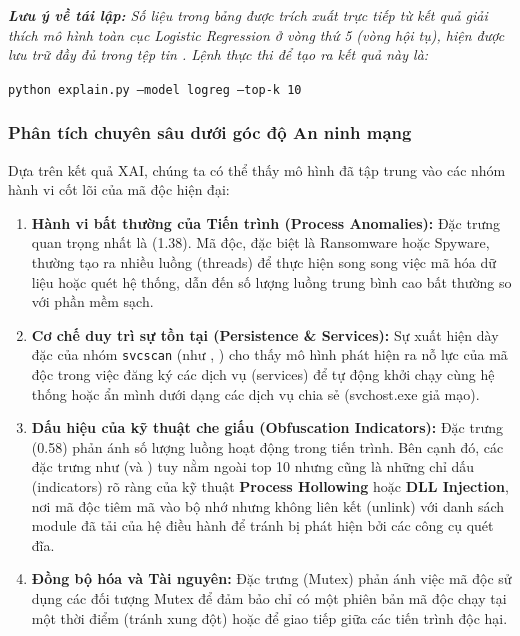 \textit{\textbf{Lưu ý về tái lập:} Số liệu trong bảng được trích xuất trực tiếp từ kết quả giải thích mô hình toàn cục Logistic Regression ở vòng thứ 5 (vòng hội tụ), hiện được lưu trữ đầy đủ trong tệp tin . Lệnh thực thi để tạo ra kết quả này là:}
\begin{center}
\texttt{python explain.py --model logreg --top-k 10}
\end{center}



\subsubsection{Phân tích chuyên sâu dưới góc độ An ninh mạng}
Dựa trên kết quả XAI, chúng ta có thể thấy mô hình đã tập trung vào các nhóm hành vi cốt lõi của mã độc hiện đại:

\begin{enumerate}
    \item \textbf{Hành vi bất thường của Tiến trình (Process Anomalies):}
    Đặc trưng quan trọng nhất là  (1.38). Mã độc, đặc biệt là Ransomware hoặc Spyware, thường tạo ra nhiều luồng (threads) để thực hiện song song việc mã hóa dữ liệu hoặc quét hệ thống, dẫn đến số lượng luồng trung bình cao bất thường so với phần mềm sạch.
    
    \item \textbf{Cơ chế duy trì sự tồn tại (Persistence \& Services):}
    Sự xuất hiện dày đặc của nhóm \texttt{svcscan} (như , ) cho thấy mô hình phát hiện ra nỗ lực của mã độc trong việc đăng ký các dịch vụ (services) để tự động khởi chạy cùng hệ thống hoặc ẩn mình dưới dạng các dịch vụ chia sẻ (svchost.exe giả mạo).
    
    \item \textbf{Dấu hiệu của kỹ thuật che giấu (Obfuscation Indicators):}
    Đặc trưng  (0.58) phản ánh số lượng luồng hoạt động trong tiến trình. Bên cạnh đó, các đặc trưng như  (và ) tuy nằm ngoài top 10 nhưng cũng là những chỉ dấu (indicators) rõ ràng của kỹ thuật \textbf{Process Hollowing} hoặc \textbf{DLL Injection}, nơi mã độc tiêm mã vào bộ nhớ nhưng không liên kết (unlink) với danh sách module đã tải của hệ điều hành để tránh bị phát hiện bởi các công cụ quét đĩa.
    
    \item \textbf{Đồng bộ hóa và Tài nguyên:}
    Đặc trưng  (Mutex) phản ánh việc mã độc sử dụng các đối tượng Mutex để đảm bảo chỉ có một phiên bản mã độc chạy tại một thời điểm (tránh xung đột) hoặc để giao tiếp giữa các tiến trình độc hại.
\end{enumerate}

